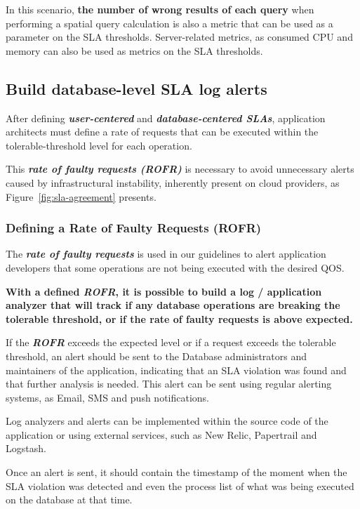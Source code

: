 In this scenario, \textbf{the number of wrong results of each query} when performing a spatial query calculation is also a metric that can be used as a parameter on the SLA thresholds. Server-related metrics, as consumed CPU and memory can also be used as metrics on the SLA thresholds.



\subsection{Build database-level SLA log alerts}

After defining \textbf{\textit{user-centered}} and \textbf{\textit{database-centered SLAs}}, application architects must define a rate of requests that can be executed within the tolerable-threshold level for each operation.

This \textbf{\textit{rate of faulty requests (ROFR)}} is necessary to avoid unnecessary alerts caused by infrastructural instability, inherently present on cloud providers, as Figure~\ref{fig:sla-agreement} presents.

\subsubsection{Defining a Rate of Faulty Requests (ROFR)}



The \textbf{\textit{rate of faulty requests}} is used in our guidelines to alert application developers that some operations are not being executed with the desired QOS.

\textbf{With a defined \textbf{\textit{ROFR}}, it is possible to build a log / application analyzer that will track if any database operations are breaking the tolerable threshold, or if the rate of faulty requests is above expected.}

If the \textbf{\textit{ROFR}} exceeds the expected level or if a request exceeds the tolerable threshold, an alert should be sent to the Database administrators and maintainers of the application, indicating that an SLA violation was found and that further analysis is needed. This alert can be sent using regular alerting systems, as Email, SMS and push notifications.

Log analyzers and alerts can be implemented within the source code of the application or using external services, such as New Relic, Papertrail and Logstash. 

Once an alert is sent, it should contain the timestamp of the moment when the SLA violation was detected and even the process list of what was being executed on the database at that time.

